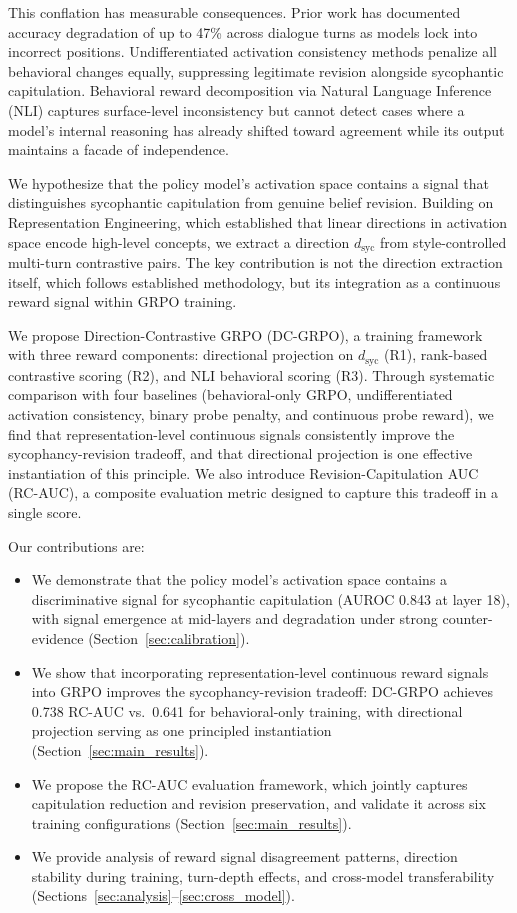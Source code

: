 \documentclass[11pt,a4paper]{article}
\newcommand{\dsyc}{$d_{\text{syc}}$}
\begin{document}
This conflation has measurable consequences. Prior work has documented accuracy degradation of up to 47\% across dialogue turns as models lock into incorrect positions. Undifferentiated activation consistency methods penalize all behavioral changes equally, suppressing legitimate revision alongside sycophantic capitulation. Behavioral reward decomposition via Natural Language Inference (NLI) captures surface-level inconsistency but cannot detect cases where a model's internal reasoning has already shifted toward agreement while its output maintains a facade of independence.

We hypothesize that the policy model's activation space contains a signal that distinguishes sycophantic capitulation from genuine belief revision. Building on Representation Engineering, which established that linear directions in activation space encode high-level concepts, we extract a direction \dsyc{} from style-controlled multi-turn contrastive pairs. The key contribution is not the direction extraction itself, which follows established methodology, but its integration as a continuous reward signal within GRPO training.

We propose Direction-Contrastive GRPO (DC-GRPO), a training framework with three reward components: directional projection on \dsyc{} (R1), rank-based contrastive scoring (R2), and NLI behavioral scoring (R3). Through systematic comparison with four baselines (behavioral-only GRPO, undifferentiated activation consistency, binary probe penalty, and continuous probe reward), we find that representation-level continuous signals consistently improve the sycophancy-revision tradeoff, and that directional projection is one effective instantiation of this principle. We also introduce Revision-Capitulation AUC (RC-AUC), a composite evaluation metric designed to capture this tradeoff in a single score.

Our contributions are:
\begin{itemize}
    \item We demonstrate that the policy model's activation space contains a discriminative signal for sycophantic capitulation (AUROC 0.843 at layer 18), with signal emergence at mid-layers and degradation under strong counter-evidence (Section~\ref{sec:calibration}).
    \item We show that incorporating representation-level continuous reward signals into GRPO improves the sycophancy-revision tradeoff: DC-GRPO achieves 0.738 RC-AUC vs.\ 0.641 for behavioral-only training, with directional projection serving as one principled instantiation (Section~\ref{sec:main_results}).
    \item We propose the RC-AUC evaluation framework, which jointly captures capitulation reduction and revision preservation, and validate it across six training configurations (Section~\ref{sec:main_results}).
    \item We provide analysis of reward signal disagreement patterns, direction stability during training, turn-depth effects, and cross-model transferability (Sections~\ref{sec:analysis}--\ref{sec:cross_model}).
\end{itemize}
\end{document}
